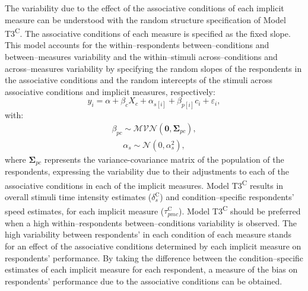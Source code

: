 \documentclass[12pt]{book}
\begin{document}
The variability due to the effect of the associative conditions of each implicit measure can be understood with the random structure specification of Model T3\textsuperscript{C}. The associative conditions of each measure is specified as the fixed slope.
This model accounts for the within--respondents between--conditions and between--measures variability and the within--stimuli across--conditions and across--measures variability by specifying the random slopes of the respondents in the associative conditions and the random intercepts of the stimuli across associative conditions and implicit measures, respectively: 
%
\begin{equation}\label{eq:type2t}
	y_{i} = \alpha + \beta_{c}X_{c} + \alpha_{s[i]} +  \beta_{p[i]}c_{i} + \varepsilon_{i},
\end{equation}
with:
\begin{align}
	\beta_{pc} \sim \mathcal{MVN}(\bm{0}, \bm{\Sigma}_{pc}),
\end{align}
\begin{align}
	\alpha_s \sim \mathcal{N} (0, \alpha_s^2),
\end{align}
where $\bm{\Sigma}_{pc}$ represents the variance-covariance matrix of the population of the respondents, expressing the variability due to their adjustments to each of the associative conditions in each of the implicit measures. 
Model T3\textsuperscript{C} results in overall stimuli time intensity estimates ($\delta_{s}^\text{C}$) and condition--specific respondents' speed estimates, for each implicit measure ($\tau_{pmc}^\text{C}$). 
Model T3\textsuperscript{C} should be preferred when a high within--respondents between--conditions variability is observed.
The high variability between respondents' in each condition of each measure stands for an effect of the associative conditions determined by each implicit measure on respondents' performance. 
By taking the difference between the condition--specific estimates of each implicit measure for each respondent, a measure of the bias on respondents' performance due to the associative conditions can be obtained. 
\end{document}
